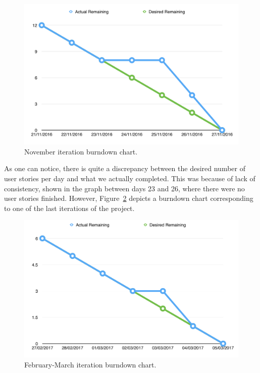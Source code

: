 \documentclass{l4proj}
\begin{document}
\begin{figure}[!ht]
\centering
\includegraphics[scale=0.6]{burndown}
\caption{November iteration burndown chart.}
\label{fig:burndown-november}
\end{figure}

As one can notice, there is quite a discrepancy between the desired number of user stories per day and what we actually
completed. This was because of lack of consistency, shown in the graph between days 23 and 26, where there were no user
stories finished. However, Figure~\ref{fig:burndown-february} depicts a burndown chart corresponding to one of the last iterations of the project.

\pagebreak

\begin{figure}[!ht]
\centering
\includegraphics[scale=0.6]{recent-burndown}
\caption{February-March iteration burndown chart.}
\label{fig:burndown-february}
\end{figure}
\end{document}
